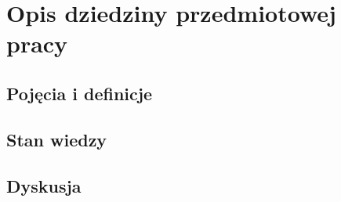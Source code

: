 % 
\newpage\section{Opis dziedziny przedmiotowej pracy}\label{sec:dziedzina}
\subsection{Pojęcia i definicje}
\subsection{Stan wiedzy}
\subsection{Dyskusja} 
